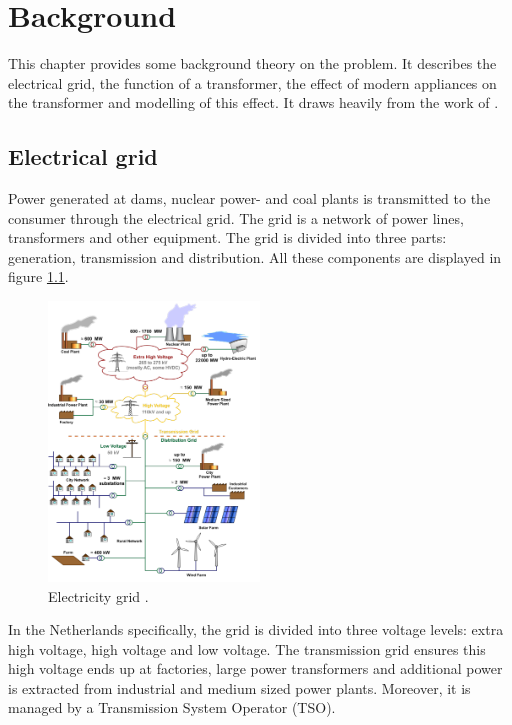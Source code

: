 \chapter{Background} \label{sec:background}

This chapter provides some background theory on the problem. It describes the electrical grid, the function of a transformer, 
the effect of modern appliances on the transformer and modelling of this effect. It draws heavily from the work of \cite{vanDijk2022}.

\section{Electrical grid}
\label{sec:grid}
Power generated at dams, nuclear power- and coal plants is transmitted to the consumer through the electrical grid. The grid is a network of power lines, transformers and other equipment. 
The grid is divided into three parts: generation, transmission and distribution. All these components are displayed in
figure \ref{fig:grid}.
\begin{figure}[H]
    \centering
    \includegraphics[width=0.5\textwidth]{img/distribution grid.png}
    \caption{Electricity grid \cite{mBizon2010}.}
    \label{fig:grid}
\end{figure} 
In the Netherlands specifically, the grid is divided into three voltage levels: extra high voltage, high voltage and low voltage.
The transmission grid ensures this high voltage ends up at factories, large power transformers and additional power is extracted from industrial and medium sized power plants.
Moreover, it is managed by a Transmission System Operator (TSO). 

